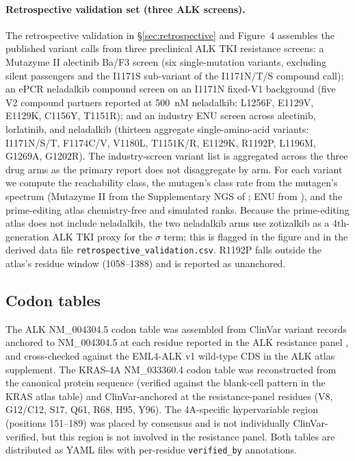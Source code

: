 \documentclass[11pt,a4paper]{article}
\begin{document}
\paragraph{Retrospective validation set (three ALK screens).}
The retrospective validation in \S\ref{sec:retrospective} and Figure~4
assembles the published variant calls from three preclinical ALK
TKI resistance screens: a Mutazyme II alectinib Ba/F3 screen
\citep{doi2022} (six single-mutation variants, excluding silent
passengers and the I1171S sub-variant of the I1171N/T/S compound call);
an ePCR neladalkib compound screen on an I1171N fixed-V1 background
\citep{takei2025} (five V2 compound partners reported at 500~nM
neladalkib: L1256F, E1129V, E1129K, C1156Y, T1151R); and an industry
ENU screen across alectinib, lorlatinib, and neladalkib
\citep{tangpeerachaikul2025} (thirteen aggregate single-amino-acid
variants: I1171N/S/T, F1174C/V, V1180L, T1151K/R, E1129K, R1192P,
L1196M, G1269A, G1202R). The industry-screen variant list is aggregated
across the three drug arms as the primary report does not disaggregate
by arm. For each variant we compute the reachability class, the
mutagen's class rate from the mutagen's spectrum (Mutazyme II from the
Supplementary NGS of \citep{doi2022}; ENU from \citep{arnold2012}),
and the prime-editing atlas chemistry-free and simulated ranks. Because the prime-editing atlas does not include neladalkib,
the two neladalkib arms use zotizalkib as a
4th-generation ALK TKI proxy for the $\sigma$ term; this is flagged in the
figure and in the derived data file
\texttt{retrospective\_validation.csv}. R1192P falls outside the
atlas's residue window (1058--1388) and is reported as unanchored.

\subsection{Codon tables}

The ALK NM\_004304.5 codon table was assembled from ClinVar variant
records anchored to NM\_004304.5 at each residue reported in the ALK
resistance panel \citep{doi2022,takei2025,oh2026}, and cross-checked
against the EML4-ALK v1 wild-type CDS in the ALK atlas supplement.
The KRAS-4A NM\_033360.4 codon table was reconstructed from the canonical
protein sequence (verified against the blank-cell pattern in the KRAS
atlas table) and ClinVar-anchored at the resistance-panel residues
(V8, G12/C12, S17, Q61, R68, H95, Y96). The 4A-specific hypervariable
region (positions 151--189) was placed by consensus and is not
individually ClinVar-verified, but this region is not involved in the
resistance panel. Both tables are distributed as YAML files with
per-residue \texttt{verified\_by} annotations.
\end{document}
